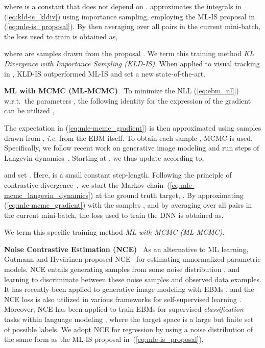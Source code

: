 \documentclass{bmvc2k}
\newcommand{\parsection}[1]{\vspace{2mm}\noindent\textbf{#1}~ }
\begin{document}
where  is a constant that does not depend on . \cite{danelljan2020probabilistic} approximates the integrals in (\ref{eq:kld-is_kldiv}) using importance sampling, employing the ML-IS proposal  in (\ref{eq:mle-is_proposal}). By then averaging over all pairs  in the current mini-batch, the loss  used to train  is obtained as,

where  are  samples drawn from the proposal . We term this training method \textit{KL Divergence with Importance Sampling (KLD-IS)}. When applied to visual tracking in \cite{danelljan2020probabilistic}, KLD-IS outperformed ML-IS and set a new state-of-the-art.








\parsection{ML with MCMC (ML-MCMC)}
To minimize the NLL (\ref{eq:ebm_nll}) w.r.t.\ the parameters , the following identity for the expression of the gradient  can be utilized \cite{lecun2006tutorial},
 
The expectation in (\ref{eq:mle-mcmc_gradient}) is then approximated using samples  drawn from , \textit{i.e.} from the EBM itself. To obtain each sample , MCMC is used. Specifically, we follow recent work \cite{xie2016theory, gao2018learning, du2019implicit, nijkamp2019learning, nijkamp2019anatomy, Grathwohl2020Your} on generative image modeling and run  steps of Langevin dynamics~\cite{welling2011bayesian}. Starting at , we thus update  according to,

and set . Here,  is a small constant step-length. Following the principle of contrastive divergence~\cite{lecun2006tutorial, hinton2002training, teh2003energy}, we start the Markov chain~(\ref{eq:mle-mcmc_langevin_dynamics}) at the ground truth target, . By approximating (\ref{eq:mle-mcmc_gradient}) with the samples , and by averaging over all pairs  in the current mini-batch, the loss  used to train the DNN  is obtained as,

We term this specific training method \textit{ML with MCMC (ML-MCMC)}.






\parsection{Noise Contrastive Estimation (NCE)}
As an alternative to ML learning, Gutmann and Hyv{\"a}rinen proposed NCE~\cite{gutmann2010noise} for estimating unnormalized parametric models. NCE entails generating samples from some noise distribution , and learning to discriminate between these noise samples and observed data examples. It has recently been applied to generative image modeling with EBMs \cite{gao2019flow}, and the NCE loss is also utilized in various frameworks for self-supervised learning \cite{hjelm2018learning, bachman2019learning, chen2020simple}. Moreover, NCE has been applied to train EBMs for supervised \emph{classification} tasks within language modeling \cite{mnih2012fast, mikolov2013distributed, jozefowicz2016exploring, ma2018noise}, where the target space  is a large but finite set of possible labels. We adopt NCE for regression by using a noise distribution  of the same form as the ML-IS proposal in~(\ref{eq:mle-is_proposal}),
\end{document}
